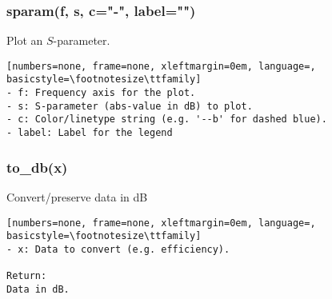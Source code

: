 \subsubsection{sparam(f, s, c="-", label="")}
Plot an $S$-parameter.

\begin{lstlisting}[numbers=none, frame=none, xleftmargin=0em, language=, basicstyle=\footnotesize\ttfamily]
- f: Frequency axis for the plot.
- s: S-parameter (abs-value in dB) to plot.
- c: Color/linetype string (e.g. '--b' for dashed blue).
- label: Label for the legend
\end{lstlisting}

\subsubsection{to\_db(x)}
Convert/preserve data in dB

\begin{lstlisting}[numbers=none, frame=none, xleftmargin=0em, language=, basicstyle=\footnotesize\ttfamily]
- x: Data to convert (e.g. efficiency).

Return:
Data in dB.
\end{lstlisting}

